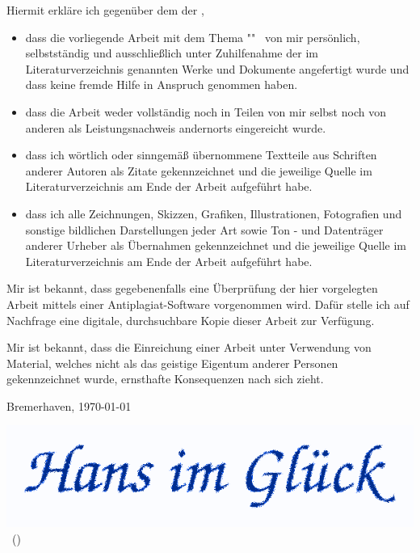 \thispagestyle{empty}

Hiermit erkläre ich gegenüber dem \sDepartment  der \sUni,

\begin{itemize}
	\item dass die vorliegende Arbeit mit dem Thema "\sTitle" \ von mir
	persönlich, selbstständig und ausschließlich unter Zuhilfenahme der im Literaturverzeichnis genannten Werke und
	Dokumente angefertigt wurde und dass keine fremde Hilfe in Anspruch genommen haben.
	\item dass die Arbeit weder vollständig noch in Teilen von mir selbst noch von anderen als Leistungsnachweis andernorts eingereicht wurde.
	\item dass ich wörtlich oder sinngemäß übernommene Textteile aus Schriften anderer Autoren als Zitate
	gekennzeichnet und die jeweilige Quelle im Literaturverzeichnis am Ende der Arbeit aufgeführt habe.
	\item dass ich alle Zeichnungen, Skizzen, Grafiken, Illustrationen, Fotografien und sonstige bildlichen	Darstellungen jeder Art sowie Ton - und Datenträger anderer Urheber als Übernahmen gekennzeichnet und die jeweilige Quelle im Literaturverzeichnis am Ende der Arbeit aufgeführt habe.
\end{itemize}

Mir ist bekannt, dass gegebenenfalls eine Überprüfung der hier vorgelegten Arbeit mittels einer
Antiplagiat-Software vorgenommen wird. Dafür stelle ich auf Nachfrage eine digitale, durchsuchbare Kopie dieser Arbeit zur Verfügung.

Mir ist bekannt, dass die Einreichung einer Arbeit unter Verwendung von Material, welches nicht als das geistige Eigentum anderer Personen gekennzeichnet wurde, ernsthafte Konsequenzen nach sich zieht.

\vspace {0.5cm}

Bremerhaven, \today \qquad

\begin{minipage}[hbt]{3in}
\vspace {0.5cm}
	\includegraphics[scale=0.15]{images/signatur.png} \\
	\sName \ (\sMtrNr)
\end{minipage}
